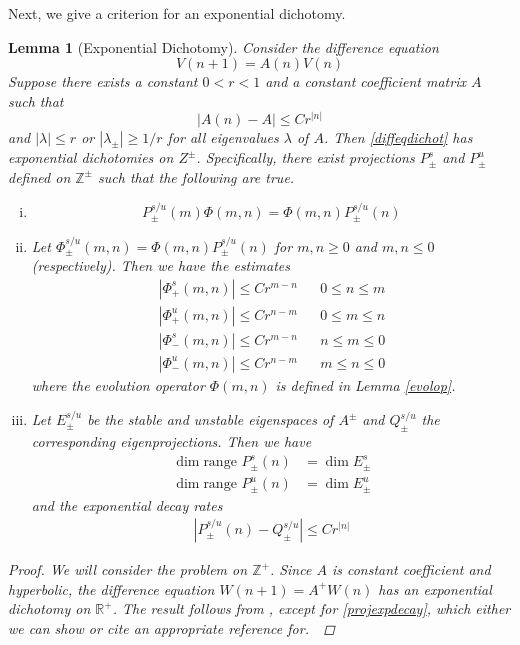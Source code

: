 \documentclass[12pt]{article}
\def\R{{\mathbb R}}
\def\Z{{\mathbb Z}}
\newtheorem{lemma}{Lemma}
\begin{document}
Next, we give a criterion for an exponential dichotomy.

\begin{lemma}[Exponential Dichotomy]\label{dichotomy}
Consider the difference equation
\begin{equation}\label{diffeqdichot}
V(n+1) = A(n) V(n)
\end{equation}
Suppose there exists a constant $0 < r < 1$ and a constant coefficient matrix $A$ such that 
\[
|A(n) - A| \leq C r^{|n|}
\]
and $|\lambda| \leq r$ or $|\lambda_\pm| \geq 1/r$ for all eigenvalues $\lambda$ of $A$. Then \eqref{diffeqdichot} has exponential dichotomies on $Z^\pm$. Specifically, there exist projections $P_\pm^s$ and $P_\pm^u$ defined on $\Z^\pm$ such that the following are true.
\begin{enumerate}[(i)]
\item
\begin{equation}\label{projcommute}
P_\pm^{s/u}(m) \Phi(m, n) =  \Phi(m, n) P_\pm^{s/u}(n)
\end{equation}

\item Let $\Phi_\pm^{s/u}(m, n) = \Phi(m, n) P_\pm^{s/u}(n)$ for $m, n \geq 0$ and $m, n \leq 0$ (respectively). Then we have the estimates
\begin{align*}
|\Phi_+^s(m, n)| \leq C r^{m - n} && 0 \leq n \leq m \\
|\Phi_+^u(m, n)| \leq C r^{n - m} && 0 \leq m \leq n \\
|\Phi_-^s(m, n)| \leq C r^{m - n} && n \leq m \leq 0 \\
|\Phi_-^u(m, n)| \leq C r^{n - m} && m \leq n \leq 0
\end{align*}
where the evolution operator $\Phi(m, n)$ is defined in Lemma \ref{evolop}. 

\item Let $E_\pm^{s/u}$ be the stable and unstable eigenspaces of $A^\pm$ and $Q_\pm^{s/u}$ the corresponding eigenprojections. Then we have
\begin{align*}
\dim \text{range }P_\pm^s(n) &= \dim E_\pm^s \\
\dim \text{range }P_\pm^u(n) &= \dim E_\pm^u
\end{align*}
and the exponential decay rates
\begin{align}\label{projexpdecay}
| P_\pm^{s/u}(n) - Q_\pm^{s/u} | \leq C r^{|n|}
\end{align}
\end{enumerate}

\begin{proof}
We will consider the problem on $\Z^+$. Since $A$ is constant coefficient and hyperbolic, the difference equation $W(n+1) = A^+ W(n)$ has an exponential dichotomy on $\R^+$. The result follows from \cite{Beyn1997}, except for \eqref{projexpdecay}, which either we can show or cite an appropriate reference for.\
\end{proof}
\end{lemma}
\end{document}
